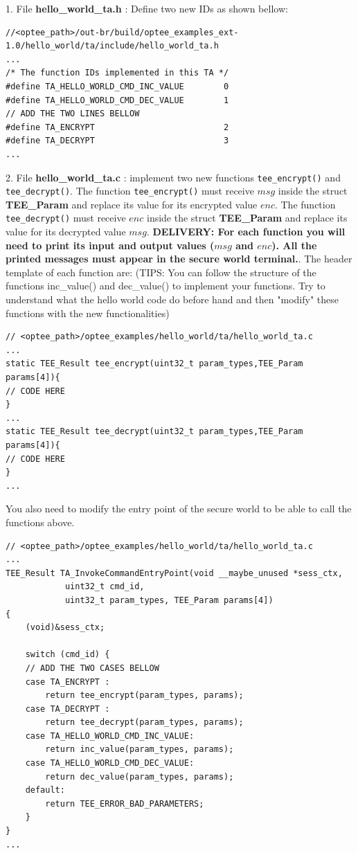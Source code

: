 \documentclass[10pt]{article}
\begin{document}
\begin{enumerate}
1. File \textbf{hello\_world\_ta.h} : Define two new IDs as shown bellow: 

\begin{lstlisting}
//<optee_path>/out-br/build/optee_examples_ext-1.0/hello_world/ta/include/hello_world_ta.h
...
/* The function IDs implemented in this TA */
#define TA_HELLO_WORLD_CMD_INC_VALUE		0
#define TA_HELLO_WORLD_CMD_DEC_VALUE		1
// ADD THE TWO LINES BELLOW 
#define TA_ENCRYPT 							2
#define TA_DECRYPT 							3
...
\end{lstlisting}

2. File \textbf{hello\_world\_ta.c} : implement two new functions \verb|tee_encrypt()| and \verb|tee_decrypt()|. The function  \verb|tee_encrypt()| must receive $msg$ inside the struct \textbf{TEE\_Param} and replace its value for its encrypted value $enc$. The function  \verb|tee_decrypt()| must receive $enc$ inside the struct \textbf{TEE\_Param} and replace its value for its decrypted value $msg$. \textbf{DELIVERY: For each function you will need to print its input and output values ($msg$ and $enc$). All the printed messages must appear in the secure world terminal.}. The header template of each function are:
(TIPS: You can follow the structure of the functions inc\_value() and dec\_value() to implement your functions. Try to understand what the hello world code do before hand and then "modify" these functions with the new functionalities)

\begin{lstlisting}
// <optee_path>/optee_examples/hello_world/ta/hello_world_ta.c
...
static TEE_Result tee_encrypt(uint32_t param_types,TEE_Param params[4]){
// CODE HERE
}
...
static TEE_Result tee_decrypt(uint32_t param_types,TEE_Param params[4]){
// CODE HERE
}
...
\end{lstlisting}

You also need to modify the entry point of the secure world to be able to call the functions above.

\begin{lstlisting}
// <optee_path>/optee_examples/hello_world/ta/hello_world_ta.c
...
TEE_Result TA_InvokeCommandEntryPoint(void __maybe_unused *sess_ctx,
			uint32_t cmd_id,
			uint32_t param_types, TEE_Param params[4])
{
	(void)&sess_ctx; 

	switch (cmd_id) {
	// ADD THE TWO CASES BELLOW
	case TA_ENCRYPT : 
		return tee_encrypt(param_types, params);
	case TA_DECRYPT : 
		return tee_decrypt(param_types, params);
	case TA_HELLO_WORLD_CMD_INC_VALUE:
		return inc_value(param_types, params);
	case TA_HELLO_WORLD_CMD_DEC_VALUE:
		return dec_value(param_types, params);
	default:
		return TEE_ERROR_BAD_PARAMETERS;
	}
}
...
\end{lstlisting}


\end{enumerate}
\end{document}
